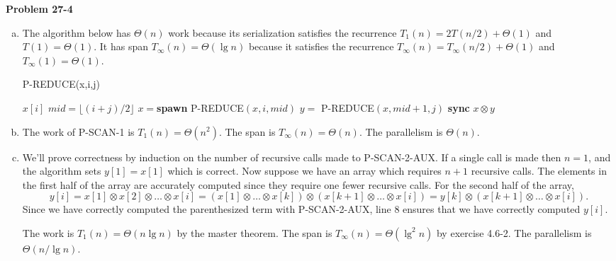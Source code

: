 \documentclass{article}
\begin{document}
\noindent\textbf{Problem 27-4}\\
\begin{enumerate}[a.]
\item The algorithm below has $\Theta(n)$ work because its serialization satisfies the recurrence $T_1(n) = 2T(n/2) + \Theta(1)$ and $T(1) = \Theta(1)$.  It has span $T_\infty(n) = \Theta(\lg n)$ because it satisfies the recurrence $T_\infty(n) = T_\infty(n/2) + \Theta(1)$ and $T_\infty(1) = \Theta(1)$. \\

\begin{algorithm}
\caption{P-REDUCE(x,i,j)}
\begin{algorithmic}[1]
	\State \Return $x[i]$
\Else
	\State $mid = \lfloor (i+j)/2 \rfloor$
	\State $x = $\textbf{spawn} P-REDUCE$(x,i, mid)$
	\State $y = $ P-REDUCE$(x,mid+1, j)$
	\State \textbf{sync}
	\State \Return $x \otimes y$
\EndIf
\end{algorithmic}
\end{algorithm}

\item The work of P-SCAN-1 is $T_1(n) = \Theta(n^2)$.  The span is $T_\infty(n) = \Theta(n)$.  The parallelism is $\Theta(n)$. \\

\item We'll prove correctness by induction on the number of recursive calls made to P-SCAN-2-AUX.  If a single call is made then $n=1$, and the algorithm sets $y[1] = x[1]$ which is correct.  Now suppose we have an array which requires $n+1$ recursive calls.  The elements in the first half of the array are accurately computed since they require one fewer recursive calls. For the second half of the array, 
\[y[i] = x[1] \otimes x[2] \otimes \ldots \otimes x[i] = (x[1] \otimes \ldots \otimes x[k]) \otimes (x[k+1] \otimes \ldots \otimes x[i]) = y[k] \otimes (x[k+1] \otimes \ldots \otimes x[i]).\]
Since we have correctly computed the parenthesized term with P-SCAN-2-AUX, line 8 ensures that we have correctly computed $y[i]$. 

The work is $T_1(n) = \Theta(n \lg n)$ by the master theorem.  The span is $T_\infty(n) = \Theta(\lg^2n)$ by exercise 4.6-2. The parallelism is $\Theta(n/\lg n)$.\\


\end{enumerate}
\end{document}
